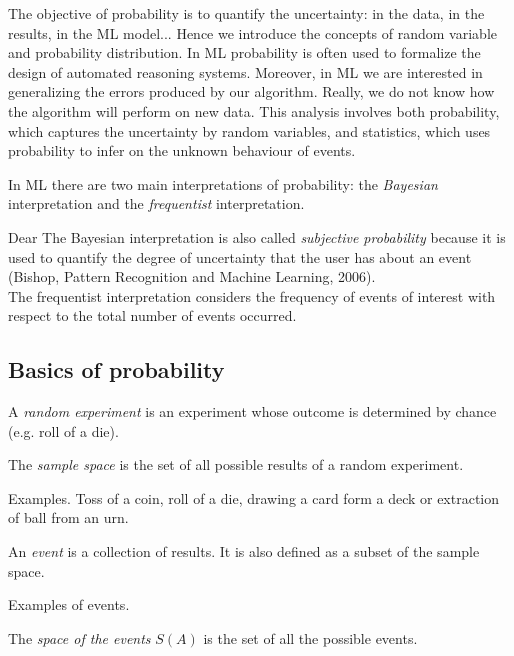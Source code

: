 The objective of probability is to quantify the uncertainty: in the data, in the results, in the ML model...
Hence we introduce the concepts of random variable and probability distribution.
In ML probability is often used to formalize the design of automated reasoning systems.
Moreover, in ML we are interested in generalizing the errors produced by our algorithm. Really, we do not know how the algorithm will perform on new data. This analysis involves both probability, which captures the uncertainty by random variables, and statistics, which uses probability to infer on the unknown behaviour of events.

In ML there are two main interpretations of probability: the \textit{Bayesian} interpretation and the \textit{frequentist} interpretation.

Dear The Bayesian interpretation is also called \textit{subjective probability} because it is used to quantify the degree of uncertainty that the user has about an event (Bishop, Pattern Recognition and Machine Learning, 2006).\\
The frequentist interpretation considers the frequency of events of interest with respect to the total number of events occurred.

\subsection{Basics of probability}

\begin{definition}
    A \textit{random experiment} is an experiment whose outcome is determined by chance (e.g. roll of a die).
\end{definition}

\begin{definition}
    The \textit{sample space} is the set of all possible results of a random experiment.
\end{definition}

Examples. Toss of a coin, roll of a die, drawing a card form a deck or extraction of ball from an urn.

\begin{definition}
    An \textit{event} is a collection of results. It is also defined as a subset of the sample space.
\end{definition}

Examples of events.

\begin{definition}
    The \textit{space of the events} $S(A)$ is the set of all the possible events.
\end{definition}

